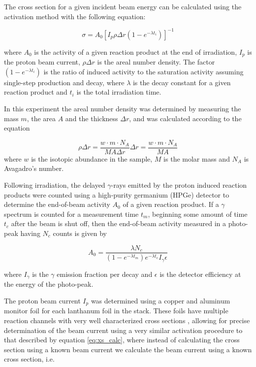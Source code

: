 \documentclass[aps,twocolumn,secnumarabic,balancelastpage,amsmath,amssymb,nofootinbib,floatfix]{revtex4-1}
\begin{document}
The cross section for a given incident beam energy can be calculated using the activation method with the following equation:

\begin{equation}
\sigma =  A_0[I_p \rho \Delta r (1-e^{-\lambda t_i})]^{-1}
\label{eq:xs_calc}
\end{equation}

where $A_0$ is the activity of a given reaction product at the end of irradiation, $I_p$ is the proton beam current, $\rho \Delta r$ is the areal number density. The factor $(1-e^{-\lambda t_i})$ is the ratio of induced activity to the saturation activity assuming single-step production and decay, where $\lambda$ is the decay constant for a given reaction product and $t_i$ is the total irradiation time.  

In this experiment the areal number density was determined by measuring the mass $m$, the area $A$ and the thickness $\Delta r$, and was calculated according to the equation

\begin{equation}
\rho \Delta r=\frac{w\cdot m \cdot N_A}{MA\Delta r}\Delta r = \frac{w\cdot m \cdot N_A}{MA}
\label{eq:number_density}
\end{equation}
where $w$ is the isotopic abundance in the sample, $M$ is the molar mass and $N_A$ is Avagadro's number.  

Following irradiation, the delayed $\gamma$-rays emitted by the proton induced reaction products were counted using a high-purity germanium (HPGe) detector to determine the end-of-beam activity $A_0$ of a given reaction product.  If a $\gamma$ spectrum is counted for a measurement time $t_m$, beginning some amount of time $t_c$ after the beam is shut off, then the end-of-beam activity measured in a photo-peak having $N_c$ counts is given by

\begin{equation}
A_0 = \frac{\lambda N_c}{(1-e^{-\lambda t_m})e^{-\lambda t_c}I_{\gamma}\epsilon}
\label{eq:activity}
\end{equation}

where $I_{\gamma}$ is the $\gamma$ emission fraction per decay and $\epsilon$ is the detector efficiency at the energy of the photo-peak.

The proton beam current $I_p$ was determined using a copper and aluminum monitor foil for each lanthanum foil in the stack.  These foils have multiple reaction channels with very well characterized cross sections \cite{IAEACPR}, allowing for precise determination of the beam current using a very similar activation procedure to that described by equation \ref{eq:xs_calc}, where instead of calculating the cross section using a known beam current we calculate the beam current using a known cross section, i.e.
\end{document}
